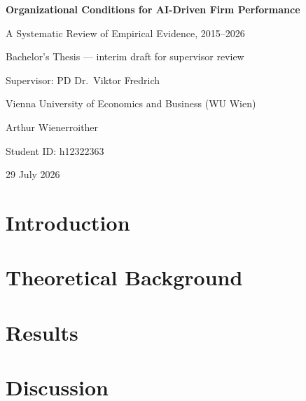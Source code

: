 \documentclass[12pt, a4paper]{report}
\begin{document}
\renewcommand{\footnote}[2][]{}

\begin{titlepage}
  \centering
  \vspace*{2cm}
  {\LARGE\bfseries Organizational Conditions for AI-Driven Firm Performance\par}
  \vspace{0.5cm}
  {\large A Systematic Review of Empirical Evidence, 2015--2026\par}
  \vspace{2cm}
  {\large Bachelor's Thesis --- interim draft for supervisor review\par}
  {\large Supervisor: PD Dr.\ Viktor Fredrich\par}
  \vspace{1cm}
  {\large Vienna University of Economics and Business (WU Wien)\par}
  \vspace{1cm}
  {\large Arthur Wienerroither\par}
  {\large Student ID: h12322363\par}
  \vspace{0.5cm}
  {\large 29 July 2026\par}
\end{titlepage}

\tableofcontents
\newpage

\chapter{Introduction}
\label{sec:intro}

\chapter{Theoretical Background}
\label{sec:background-skeleton}



\chapter{Results}
\label{sec:results}

\chapter{Discussion}
\label{sec:discussion}
\end{document}
